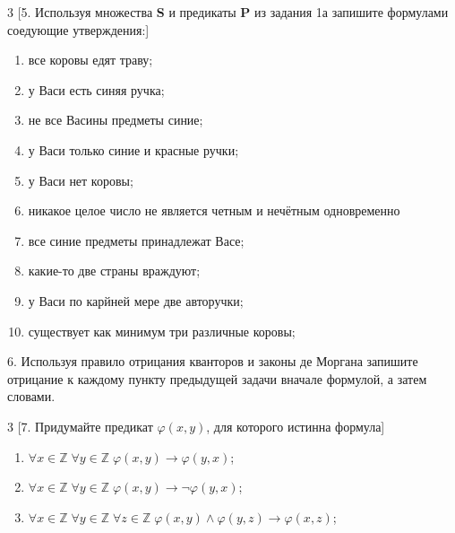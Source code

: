 \documentclass[a4paper,10pt]{article}
\begin{document}
\begin{multicols}{3}
	[5. Используя множества \textbf S и предикаты \textbf P из задания 1а запишите формулами соедующие утверждения:]
	\begin{enumerate}[label=(\arabic*)\,]
		\item все коровы едят траву;
		\item у Васи есть синяя ручка;
		\item не все Васины предметы синие;
		\item у Васи только синие и красные ручки;
		\item у Васи нет коровы;
		\item никакое целое число не является четным и нечётным одновременно
		\item все синие предметы принадлежат Васе;
		\item какие-то две страны враждуют;
		\item у Васи по карйней мере две авторучки;
		\item существует как минимум три различные коровы;
	\end{enumerate}
\end{multicols}
6. Используя правило отрицания кванторов и законы де Моргана запишите отрицание к каждому пункту предыдущей задачи вначале формулой, а затем словами.

\begin{multicols}{3}
	[7. Придумайте предикат $\varphi(x,y)$, для которого истинна формула]
	\begin{enumerate}[label=(\arabic*)\,]
		\item $\forall x\in\mathbb Z\; \forall y\in\mathbb Z\; \varphi(x,y)\to\varphi(y,x)$;
		\item $\forall x\in\mathbb Z\; \forall y\in\mathbb Z\; \varphi(x,y)\to\lnot\varphi(y,x)$;
		\item $\forall x\in\mathbb Z\; \forall y\in\mathbb Z\; \forall z\in\mathbb Z\; \varphi(x,y)\land\varphi(y,z)\to\varphi(x,z)$;
	\end{enumerate}
\end{multicols}
\end{document}
